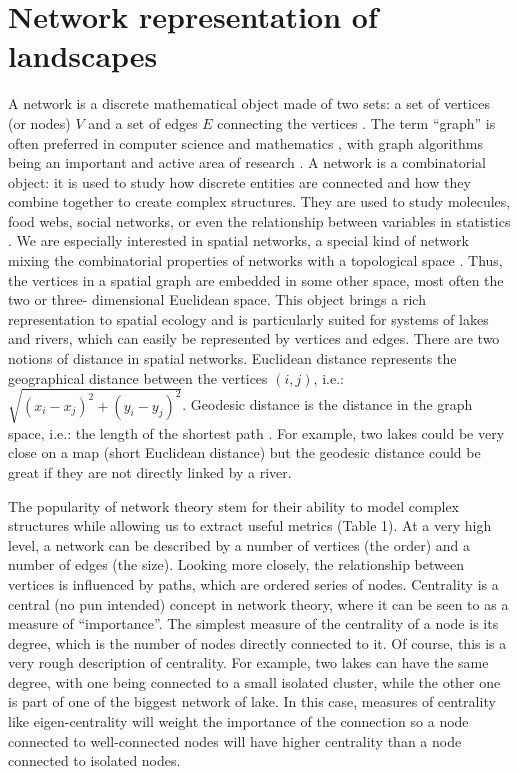 \documentclass[12pt]{article}
\begin{document}
\section{Network representation of landscapes}

A network is a discrete mathematical object made of two sets: a set of
vertices (or nodes) $V$ and a set of edges $E$ connecting the vertices
\cite{new10}. The term ``graph'' is often preferred in computer science and
mathematics \cite{gro06}, with graph algorithms being an important and active
area of research \cite{sed01}. A network is a combinatorial object: it is
used to study how discrete entities are connected and how they combine
together to create complex structures. They are used to study molecules, food
webs, social networks, or even the relationship between variables in
statistics \cite{wri21,new10}. We are especially interested in spatial
networks, a special kind of network mixing the combinatorial properties of
networks with a topological space \cite{kob94}. Thus, the vertices in a
spatial graph are embedded in some other space, most often the two or three-
dimensional Euclidean space. This object brings a rich representation to
spatial ecology and is particularly suited for systems of lakes and rivers, which can
easily be represented by vertices and edges. There are two notions of
distance in spatial networks. Euclidean distance represents the geographical
distance between the vertices $(i, j)$, i.e.: $\sqrt{(x_i - x_j)^2 + (y_i - y_
j)^2}$. Geodesic distance is the distance in the graph space, i.e.: the
length of the shortest path \cite{dij59}. For example, two lakes could be
very close on a map (short Euclidean distance) but the geodesic distance could be great if they are not directly
linked by a river.

The popularity of network theory stem for their ability to model complex
structures while allowing us to extract useful metrics (Table 1). At a very high level, 
a network can be described by a number of vertices (the order) and a number
of edges (the size). Looking more closely, the relationship between vertices
is influenced by paths, which are ordered series of nodes.
Centrality is a central (no pun intended) concept in network theory, where it
can be seen to as a measure of ``importance''. The simplest measure
of the centrality of a node is its degree, which is the number of nodes directly connected to it. Of course, this is a very rough description of centrality. For
example, two lakes can have the same degree, with one being connected to
a small isolated cluster, while the other one is part of one of the biggest 
network of lake. In this case, measures of centrality like eigen-centrality will
weight the importance of the connection so a node connected to well-connected
nodes will have higher centrality than a node connected to isolated nodes.
\end{document}
